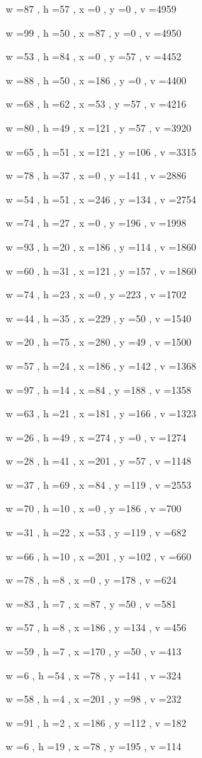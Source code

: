 \documentclass[11pt]{article}
\begin{document}
w =87 , h =57 , x =0 , y =0 , v =4959
\par
w =99 , h =50 , x =87 , y =0 , v =4950
\par
w =53 , h =84 , x =0 , y =57 , v =4452
\par
w =88 , h =50 , x =186 , y =0 , v =4400
\par
w =68 , h =62 , x =53 , y =57 , v =4216
\par
w =80 , h =49 , x =121 , y =57 , v =3920
\par
w =65 , h =51 , x =121 , y =106 , v =3315
\par
w =78 , h =37 , x =0 , y =141 , v =2886
\par
w =54 , h =51 , x =246 , y =134 , v =2754
\par
w =74 , h =27 , x =0 , y =196 , v =1998
\par
w =93 , h =20 , x =186 , y =114 , v =1860
\par
w =60 , h =31 , x =121 , y =157 , v =1860
\par
w =74 , h =23 , x =0 , y =223 , v =1702
\par
w =44 , h =35 , x =229 , y =50 , v =1540
\par
w =20 , h =75 , x =280 , y =49 , v =1500
\par
w =57 , h =24 , x =186 , y =142 , v =1368
\par
w =97 , h =14 , x =84 , y =188 , v =1358
\par
w =63 , h =21 , x =181 , y =166 , v =1323
\par
w =26 , h =49 , x =274 , y =0 , v =1274
\par
w =28 , h =41 , x =201 , y =57 , v =1148
\par
w =37 , h =69 , x =84 , y =119 , v =2553
\par
w =70 , h =10 , x =0 , y =186 , v =700
\par
w =31 , h =22 , x =53 , y =119 , v =682
\par
w =66 , h =10 , x =201 , y =102 , v =660
\par
w =78 , h =8 , x =0 , y =178 , v =624
\par
w =83 , h =7 , x =87 , y =50 , v =581
\par
w =57 , h =8 , x =186 , y =134 , v =456
\par
w =59 , h =7 , x =170 , y =50 , v =413
\par
w =6 , h =54 , x =78 , y =141 , v =324
\par
w =58 , h =4 , x =201 , y =98 , v =232
\par
w =91 , h =2 , x =186 , y =112 , v =182
\par
w =6 , h =19 , x =78 , y =195 , v =114
\par
\newpage
\end{document}
